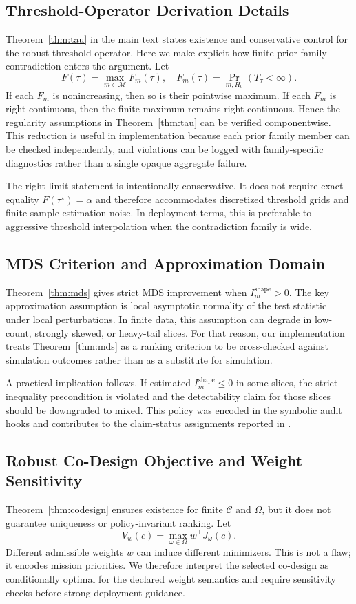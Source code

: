 \subsection{Threshold-Operator Derivation Details}
Theorem~\ref{thm:tau} in the main text states existence and conservative control for the robust threshold operator. Here we make explicit how finite prior-family contradiction enters the argument. Let
\[
F(\tau)=\max_{m\in\mathcal{M}} F_m(\tau),\quad F_m(\tau)=\Pr_{m,H_0}(T_\tau<\infty).
\]
If each $F_m$ is nonincreasing, then so is their pointwise maximum. If each $F_m$ is right-continuous, then the finite maximum remains right-continuous. Hence the regularity assumptions in Theorem~\ref{thm:tau} can be verified componentwise. This reduction is useful in implementation because each prior family member can be checked independently, and violations can be logged with family-specific diagnostics rather than a single opaque aggregate failure.

The right-limit statement is intentionally conservative. It does not require exact equality $F(\tau^\star)=\alpha$ and therefore accommodates discretized threshold grids and finite-sample estimation noise. In deployment terms, this is preferable to aggressive threshold interpolation when the contradiction family is wide.

\subsection{MDS Criterion and Approximation Domain}
Theorem~\ref{thm:mds} gives strict MDS improvement when $I_m^{\mathrm{shape}}>0$. The key approximation assumption is local asymptotic normality of the test statistic under local perturbations. In finite data, this assumption can degrade in low-count, strongly skewed, or heavy-tail slices. For that reason, our implementation treats Theorem~\ref{thm:mds} as a ranking criterion to be cross-checked against simulation outcomes rather than as a substitute for simulation.

A practical implication follows. If estimated $I_m^{\mathrm{shape}}\le 0$ in some slices, the strict inequality precondition is violated and the detectability claim for those slices should be downgraded to mixed. This policy was encoded in the symbolic audit hooks and contributes to the claim-status assignments reported in .

\subsection{Robust Co-Design Objective and Weight Sensitivity}
Theorem~\ref{thm:codesign} ensures existence for finite $\mathcal{C}$ and $\Omega$, but it does not guarantee uniqueness or policy-invariant ranking. Let
\[
V_w(c)=\max_{\omega\in\Omega} w^\top J_\omega(c).
\]
Different admissible weights $w$ can induce different minimizers. This is not a flaw; it encodes mission priorities. We therefore interpret the selected co-design as conditionally optimal for the declared weight semantics and require sensitivity checks before strong deployment guidance.

